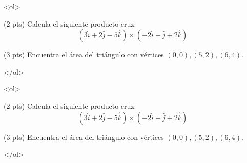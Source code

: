 \documentclass[12pt]{article}
\begin{document}
\bigskip

            
\bigskip
\bigskip
\bigskip


<ol>

\item (2 pts) Calcula el siguiente producto cruz:
  $$(3\hat{i}+2\hat{j}-5\hat{k})\times (-2\hat{i}+\hat{j}+2\hat{k})$$

\vspace{3.5cm}
  
  \item (3 pts) Encuentra el área del triángulo con vértices $(0,0), (5,2), (6,4)$.

  </ol>


  \vspace{3cm}

  
\bigskip

            
\bigskip
\bigskip
\bigskip


<ol>

\item (2 pts) Calcula el siguiente producto cruz:
  $$(3\hat{i}+2\hat{j}-5\hat{k})\times (-2\hat{i}+\hat{j}+2\hat{k})$$

\vspace{3.5cm}
  
  \item (3 pts) Encuentra el área del triángulo con vértices $(0,0), (5,2), (6,4)$.

</ol>
  
\end{document}
